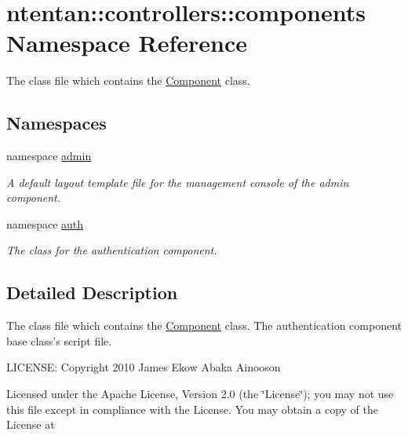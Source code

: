\hypertarget{namespacententan_1_1controllers_1_1components}{
\section{ntentan::controllers::components Namespace Reference}
\label{namespacententan_1_1controllers_1_1components}
}


The class file which contains the \hyperlink{class_component}{Component} class.  


\subsection*{Namespaces}
\begin{DoxyCompactItemize}
\item 
namespace \hyperlink{namespacententan_1_1controllers_1_1components_1_1admin}{admin}


\begin{DoxyCompactList}\small\item\em A default layout template file for the management console of the admin component. \item\end{DoxyCompactList}

\item 
namespace \hyperlink{namespacententan_1_1controllers_1_1components_1_1auth}{auth}


\begin{DoxyCompactList}\small\item\em The class for the authentication component. \item\end{DoxyCompactList}

\end{DoxyCompactItemize}


\subsection{Detailed Description}
The class file which contains the \hyperlink{class_component}{Component} class. The authentication component base class's script file.

LICENSE: Copyright 2010 James Ekow Abaka Ainooson

Licensed under the Apache License, Version 2.0 (the \char`\"{}License\char`\"{}); you may not use this file except in compliance with the License. You may obtain a copy of the License at

